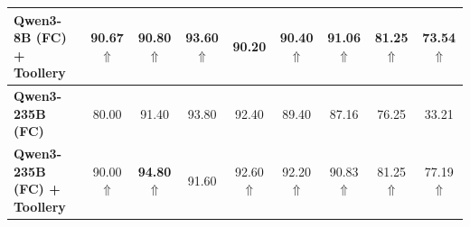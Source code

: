 \begin{table}[htb]
{\begin{tabular}{lcccccccc}
\textbf{Qwen3-8B (FC) + Toollery}           & 90.67 $\Uparrow$ & 90.80 $\Uparrow$ & 93.60 $\Uparrow$ & 90.20 & 90.40 $\Uparrow$ & \textbf{91.06} $\Uparrow$ & 81.25 $\Uparrow$ & 73.54 $\Uparrow$            \\ \hline
\textbf{Qwen3-235B (FC)}                    & 80.00 & 91.40 & 93.80 & 92.40 & 89.40 & 87.16 & 76.25 & 33.21            \\
\textbf{Qwen3-235B (FC) + Toollery}         & 90.00 $\Uparrow$ & \textbf{94.80} $\Uparrow$ & 91.60 & 92.60 $\Uparrow$ & 92.20 $\Uparrow$ & 90.83 $\Uparrow$ & 81.25 $\Uparrow$ & 77.19 $\Uparrow$            \\ \hline \hline
\end{tabular}
}
\vskip -0.1in
\end{table}